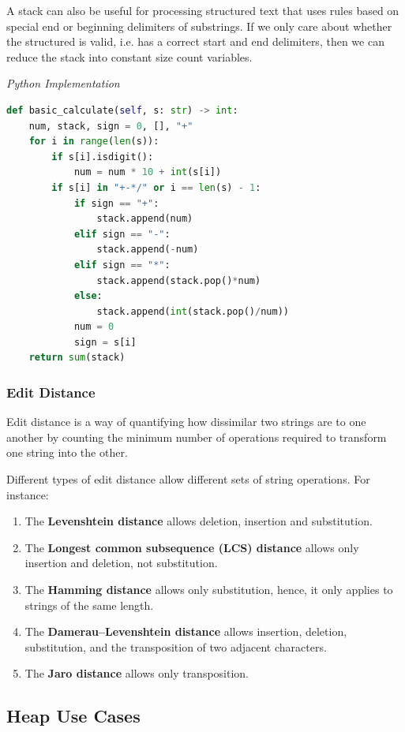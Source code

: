 \documentclass{article}
\begin{document}
A stack can also be useful for processing structured text that uses rules based on special end or beginning delimiters of substrings. If we only care about whether the structured is valid, i.e. has a correct start and end delimiters, then we can reduce the stack into constant size count variables.

\vspace{8pt} \emph{Python Implementation}
\begin{lstlisting}[language=Python]
def basic_calculate(self, s: str) -> int:
    num, stack, sign = 0, [], "+"
    for i in range(len(s)):
        if s[i].isdigit():
            num = num * 10 + int(s[i])
        if s[i] in "+-*/" or i == len(s) - 1:
            if sign == "+":
                stack.append(num)
            elif sign == "-":
                stack.append(-num)
            elif sign == "*":
                stack.append(stack.pop()*num)
            else:
                stack.append(int(stack.pop()/num))
            num = 0
            sign = s[i]
    return sum(stack)
\end{lstlisting}

    \subsubsection{Edit Distance}
    Edit distance is a way of quantifying how dissimilar two strings are to one another by counting the minimum number of operations required to transform one string into the other. 

    Different types of edit distance allow different sets of string operations. For instance:
    \begin{enumerate}
        \item The \textbf{Levenshtein distance} allows deletion, insertion and substitution.
        \item The \textbf{Longest common subsequence (LCS) distance} allows only insertion and deletion, not substitution.
        \item The \textbf{Hamming distance} allows only substitution, hence, it only applies to strings of the same length.
        \item The \textbf{Damerau–Levenshtein distance} allows insertion, deletion, substitution, and the transposition of two adjacent characters.
        \item The \textbf{Jaro distance} allows only transposition.
    \end{enumerate}
    
    \subsection{Heap Use Cases}
\end{document}
